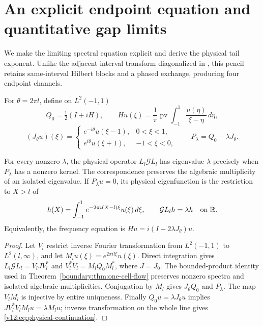 \section{An explicit endpoint equation and quantitative gap limits}
\label{v12:sec:boundary-mellin}

We make the limiting spectral equation explicit and derive the physical
tail exponent. Unlike the adjacent-interval transform diagonalized in
\cite[Sections~2--4]{BertolaEtAl2020}, this pencil retains same-interval
Hilbert blocks and a phased exchange, producing four endpoint channels.

For $\theta=2\pi l$, define on $L^2(-1,1)$
\[
 Q_0=\tfrac12(I+iH),\qquad
 Hu(\xi)=\frac1\pi\operatorname{pv}\int_{-1}^1
                   \frac{u(\eta)}{\xi-\eta}\,d\eta,
\]
\[
 (J_\theta u)(\xi)=
 \begin{cases}e^{-i\theta}u(\xi-1),&0<\xi<1,\\
 e^{i\theta}u(\xi+1),&-1<\xi<0,
 \end{cases}
 \qquad P_\lambda=Q_0-\lambda J_\theta.
\]

\begin{proposition}\label{v12:prop:frequency-pencil}
For every nonzero $\lambda$, the physical operator $L_l\mathcal G L_l$
has eigenvalue $\lambda$ precisely when $P_\lambda$ has a nonzero kernel.
The correspondence preserves the algebraic multiplicity of an isolated
eigenvalue.  If $P_\lambda u=0$, its physical eigenfunction is the
restriction to $X>l$ of
\begin{equation}\label{v12:eq:physical-continuation}
 h(X)=\int_{-1}^1e^{-2\pi i(X-l)\xi}u(\xi)\,d\xi,
 \qquad \mathcal G L_lh=\lambda h\quad\hbox{on }\mathbb R.
\end{equation}
Equivalently, the frequency equation is
$Hu=i(I-2\lambda J_\theta)u$.
\end{proposition}
\begin{proof}
Let $V_l$ restrict inverse Fourier transformation from $L^2(-1,1)$ to
$L^2(l,\infty)$, and let $M_lu(\xi)=e^{2\pi il\xi}u(\xi)$.
Direct integration gives $L_l\mathcal G L_l=V_lJV_l^*$ and
$V_l^*V_l=M_lQ_0M_l^*$, where $J=J_0$.
The bounded-product identity used in
Theorem~\ref{boundary:thm:one-cell-flow} preserves nonzero spectra
and isolated algebraic multiplicities. Conjugation by $M_l$ gives
$J_\theta Q_0$ and $P_\lambda$. The map $V_lM_l$ is injective by
entire uniqueness. Finally $Q_0u=\lambda J_\theta u$ implies
$JV_l^*V_lM_lu=\lambda M_lu$; inverse transformation on the whole line
gives \eqref{v12:eq:physical-continuation}.
\end{proof}

